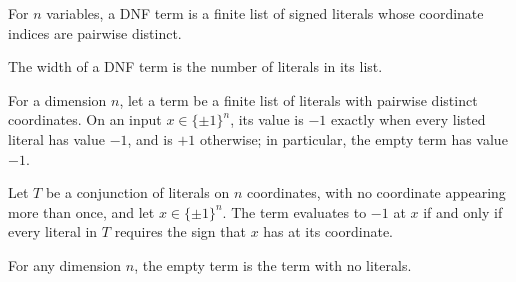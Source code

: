 \begin{definition}
\label{FABL.DNFTerm}
\leanok
{}
For $n$ variables, a DNF term is a finite list of signed literals whose coordinate
indices are pairwise distinct.
\end{definition}

\begin{definition}
\label{FABL.DNFTerm.width}
\leanok
{}
The width of a DNF term is the number of literals in its list.
\end{definition}

\begin{definition}
\label{FABL.DNFTerm.eval}
\leanok
{}
For a dimension $n$, let a term be a finite list of literals with pairwise distinct
coordinates. On an input $x\in\{\pm1\}^n$, its value is $-1$ exactly when every listed
literal has value $-1$, and is $+1$ otherwise; in particular, the empty term has value
$-1$.
\end{definition}

\begin{theorem}
\label{FABL.DNFTerm.eval_eq_neg_one_iff}
\leanok
{}
Let $T$ be a conjunction of literals on $n$ coordinates, with no coordinate appearing
more than once, and let $x\in\{\pm1\}^n$. The term evaluates to $-1$ at $x$ if and only
if every literal in $T$ requires the sign that $x$ has at its coordinate.
\end{theorem}

\begin{definition}
\label{FABL.DNFTerm.empty}
\leanok
{}
For any dimension $n$, the empty term is the term with no literals.
\end{definition}

